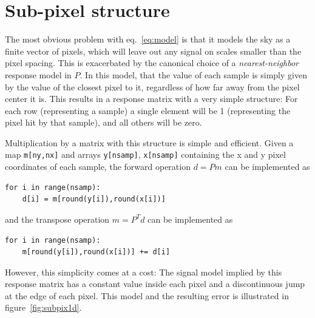 \documentclass{article}
\newcommand{\code}[1]{\texttt{#1}}
\begin{document}
\section{Sub-pixel structure}
The most obvious problem with eq.~\ref{eq:model} is that it models the sky as a
finite vector of pixels, which will leave out any signal on scales smaller than the
pixel spacing. This is exacerbated by the canonical choice of a \emph{nearest-neighbor} response
model in $P$. In this model, that the value of each sample is simply given by the value of the
closest pixel to it, regardless of how far away from the pixel center it is. This results
in a response matrix with a very simple structure: For each row (representing a sample)
a single element will be 1 (representing the pixel hit by that sample), and all others
will be zero.

Multiplication by a matrix with this structure is simple and efficient.
Given a map \code{m[ny,nx]} and arrays \code{y[nsamp]}, \code{x[nsamp]} containing the x and y pixel coordinates
of each sample, the forward operation $d = Pm$ can be implemented as
\begin{lstlisting}
for i in range(nsamp):
	d[i] = m[round(y[i]),round(x[i])]
\end{lstlisting}
and the transpose operation $m = P^Td$ can be implemented as
\begin{lstlisting}
for i in range(nsamp):
	m[round(y[i]),round(x[i])] += d[i]
\end{lstlisting}
However, this simplicity comes at a cost: The signal model implied by this
response matrix has a constant value inside each pixel and a discontinuous jump
at the edge of each pixel. This model and the resulting error is illustrated in figure~\ref{fig:subpix1d}.
\end{document}
